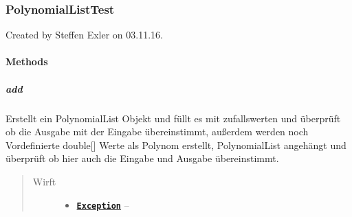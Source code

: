 \documentclass[letterpaper,10pt,ngerman]{sphinxmanual}
\begin{document}
\subsubsection{PolynomialListTest}
\label{com/linuxluigi/polynomial/PolynomialListTest:polynomiallisttest}\label{com/linuxluigi/polynomial/PolynomialListTest::doc}

\begin{fulllineitems}
\label{com/linuxluigi/polynomial/PolynomialListTest:com.linuxluigi.polynomial.PolynomialListTest}
Created by Steffen Exler on 03.11.16.

\end{fulllineitems}



\paragraph{Methods}
\label{com/linuxluigi/polynomial/PolynomialListTest:methods}

\subparagraph{add}
\label{com/linuxluigi/polynomial/PolynomialListTest:add}

\begin{fulllineitems}
\label{com/linuxluigi/polynomial/PolynomialListTest:com.linuxluigi.polynomial.PolynomialListTest.add()}
Erstellt ein PolynomialList Objekt und füllt es mit zufallswerten und überprüft ob die Ausgabe mit der Eingabe übereinstimmt, außerdem werden noch Vordefinierte double{[}{]} Werte als Polynom erstellt, PolynomialList angehängt und überprüft ob hier auch die Eingabe und Ausgabe übereinstimmt.
\begin{quote}\begin{description}
\item[{Wirft}] \leavevmode\begin{itemize}
\item {} 
\href{http://docs.oracle.com/javase/6/docs/api/java/lang/Exception.html}{\textbf{\texttt{Exception}}} -- 

\end{itemize}

\end{description}\end{quote}

\end{fulllineitems}
\end{document}
